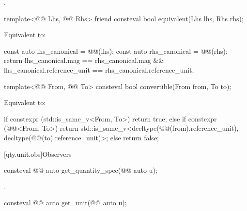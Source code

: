 \begin{itemdescr}
\pnum
\returns
{}.
\end{itemdescr}

\begin{itemdecl}
template<@@ Lhs, @@ Rhs>
friend consteval bool equivalent(Lhs lhs, Rhs rhs);
\end{itemdecl}

\begin{itemdescr}
\pnum
\effects
Equivalent to:
\begin{codeblock}
const auto lhs_canonical = @@(lhs);
const auto rhs_canonical = @@(rhs);
return lhs_canonical.mag == rhs_canonical.mag &&
       lhs_canonical.reference_unit == rhs_canonical.reference_unit;
\end{codeblock}
\end{itemdescr}

\begin{itemdecl}
template<@@ From, @@ To>
consteval bool convertible(From from, To to);
\end{itemdecl}

\begin{itemdescr}
\pnum
\effects
Equivalent to:
\begin{codeblock}
if constexpr (std::is_same_v<From, To>)
  return true;
else if constexpr (@@<From, To>)
  return std::is_same_v<decltype(@@(from).reference_unit),
                        decltype(@@(to).reference_unit)>;
else
  return false;
\end{codeblock}
\end{itemdescr}

[qty.unit.obs]{Observers}

\begin{itemdecl}
consteval @@ auto get_quantity_spec(@@ auto u);
\end{itemdecl}

\begin{itemdescr}
\pnum
\returns
{}.
\end{itemdescr}

\begin{itemdecl}
consteval @@ auto get_unit(@@ auto u);
\end{itemdecl}

